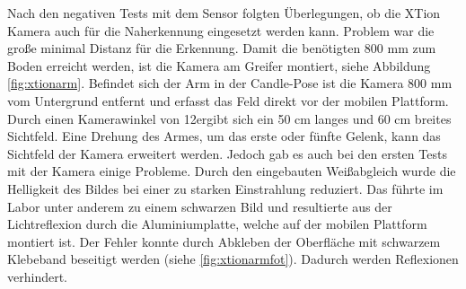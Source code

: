 Nach den negativen Tests mit dem Sensor folgten Überlegungen, ob die XTion Kamera auch für die Naherkennung eingesetzt werden kann. Problem war die große minimal Distanz für die Erkennung. Damit die benötigten 800 mm zum Boden erreicht werden, ist die Kamera am Greifer montiert, siehe Abbildung \ref{fig:xtionarm}. Befindet sich der Arm in der Candle-Pose ist die Kamera 800 mm vom Untergrund entfernt und erfasst das Feld direkt vor der mobilen Plattform. Durch einen Kamerawinkel von 12\textdegree ergibt sich ein 50 cm langes und 60 cm breites Sichtfeld. Eine Drehung des Armes, um das erste oder fünfte Gelenk, kann das Sichtfeld der Kamera erweitert werden. Jedoch gab es auch bei den ersten Tests mit der Kamera einige Probleme. Durch den eingebauten Weißabgleich wurde die Helligkeit des Bildes bei einer zu starken Einstrahlung reduziert. Das führte im Labor unter anderem zu einem schwarzen Bild und resultierte aus der Lichtreflexion durch die Aluminiumplatte, welche auf der mobilen Plattform montiert ist. Der Fehler konnte durch Abkleben der Oberfläche mit schwarzem Klebeband beseitigt werden (siehe \ref{fig:xtionarmfot}). Dadurch werden Reflexionen verhindert.

